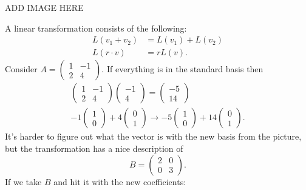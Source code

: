ADD IMAGE HERE 

A linear transformation consists of the following:
\begin{align*}
  L(v_1+v_2)&=L(v_1)+L(v_2)\\
  L(r\cdot v)&=rL(v)
.\end{align*}
  Consider $A = \begin{pmatrix} 1&-1\\2&4 \end{pmatrix} $. If everything is in the standard basis then 
  \begin{align*}
    \begin{pmatrix} 1&-1\\2&4 \end{pmatrix} \begin{pmatrix} -1\\4 \end{pmatrix} =\begin{pmatrix} -5\\14 \end{pmatrix} \\
    -1\begin{pmatrix} 1\\0 \end{pmatrix} + 4\begin{pmatrix} 0\\1 \end{pmatrix} \to -5\begin{pmatrix} 1\\0 \end{pmatrix} +14\begin{pmatrix} 0\\1 \end{pmatrix} 
  .\end{align*}
  It's harder to figure out what the vector is with the new basis from the picture, but the transformation has a nice description of \[
    B=\begin{pmatrix} 2&0\\0&3 \end{pmatrix} 
  .\] 
  If we take $B$ and hit it with the new coefficients:

